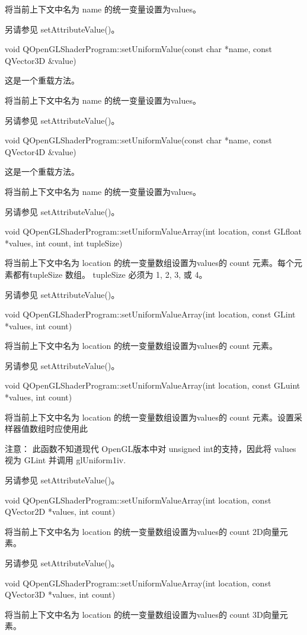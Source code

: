 将当前上下文中名为 name 的统一变量设置为values。

另请参见 setAttributeValue()。

void QOpenGLShaderProgram::setUniformValue(const char *name, const QVector3D \&value)

这是一个重载方法。

将当前上下文中名为 name 的统一变量设置为values。

另请参见 setAttributeValue()。

void QOpenGLShaderProgram::setUniformValue(const char *name, const QVector4D \&value)

这是一个重载方法。

将当前上下文中名为 name 的统一变量设置为values。

另请参见 setAttributeValue()。

void QOpenGLShaderProgram::setUniformValueArray(int location, const GLfloat *values, int count, int tupleSize)

将当前上下文中名为 location 的统一变量数组设置为values的 count 元素。每个元素都有tupleSize 数组。 tupleSize 必须为 1, 2, 3, 或 4。

另请参见 setAttributeValue()。

void QOpenGLShaderProgram::setUniformValueArray(int location, const GLint *values, int count)

将当前上下文中名为 location 的统一变量数组设置为values的 count 元素。

另请参见 setAttributeValue()。

void QOpenGLShaderProgram::setUniformValueArray(int location, const GLuint *values, int count)

将当前上下文中名为 location 的统一变量数组设置为values的 count 元素。设置采样器值数组时应使用此

注意： 此函数不知道现代 OpenGL版本中对 unsigned int的支持，因此将 values 视为 GLint 并调用 glUniform1iv.

另请参见 setAttributeValue()。

void QOpenGLShaderProgram::setUniformValueArray(int location, const QVector2D *values, int count)

将当前上下文中名为 location 的统一变量数组设置为values的 count 2D向量元素。

另请参见 setAttributeValue()。

void QOpenGLShaderProgram::setUniformValueArray(int location, const QVector3D *values, int count)

将当前上下文中名为 location 的统一变量数组设置为values的 count 3D向量元素。

